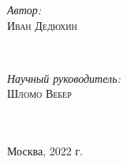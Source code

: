 \documentclass[12pt]{article}
\begin{document}
\begin{titlepage}
\begin{minipage}{0.4\textwidth}
\begin{flushleft} \large
\emph{Автор:}\\
 \textsc{Иван Дедюхин} %
 \vspace{2.5cm}
\end{flushleft}
\end{minipage}
~
\begin{minipage}{0.4\textwidth}
\begin{flushleft} \large
\emph{Научный руководитель:} \\
\textsc{Шломо Вебер} \\%
\vspace{1cm}
\emph{} \\
\textsc{} %

\end{flushleft}
\end{minipage}\\[3cm]




{\large Москва, 2022 г.}%




\vfill %

\end{titlepage}
\end{document}
